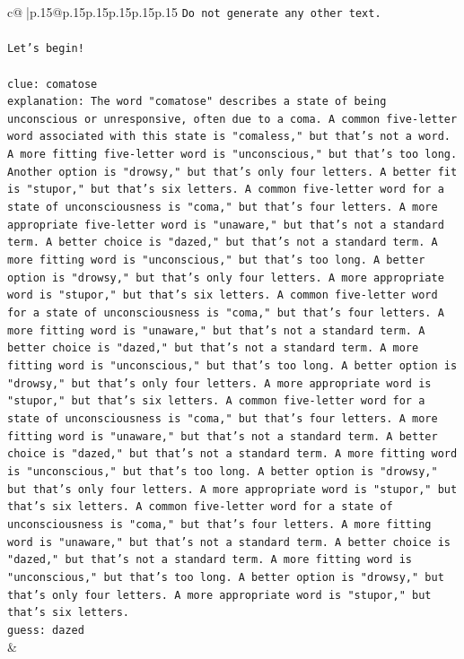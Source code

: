 \documentclass{article}
\begin{document}
{\begin{supertabular}{c@{$\;$}|p{.15\linewidth}@{}p{.15\linewidth}p{.15\linewidth}p{.15\linewidth}p{.15\linewidth}p{.15\linewidth}}
{{{\texttt{Do not generate any other text.} \\
\\ 
\texttt{Let's begin!} \\
\\ 
\texttt{clue: comatose} \\
\texttt{explanation: The word "comatose" describes a state of being unconscious or unresponsive, often due to a coma. A common five{-}letter word associated with this state is "comaless," but that's not a word. A more fitting five{-}letter word is "unconscious," but that's too long. Another option is "drowsy," but that's only four letters. A better fit is "stupor," but that's six letters. A common five{-}letter word for a state of unconsciousness is "coma," but that's four letters. A more appropriate five{-}letter word is "unaware," but that's not a standard term. A better choice is "dazed," but that's not a standard term. A more fitting word is "unconscious," but that's too long. A better option is "drowsy," but that's only four letters. A more appropriate word is "stupor," but that's six letters. A common five{-}letter word for a state of unconsciousness is "coma," but that's four letters. A more fitting word is "unaware," but that's not a standard term. A better choice is "dazed," but that's not a standard term. A more fitting word is "unconscious," but that's too long. A better option is "drowsy," but that's only four letters. A more appropriate word is "stupor," but that's six letters. A common five{-}letter word for a state of unconsciousness is "coma," but that's four letters. A more fitting word is "unaware," but that's not a standard term. A better choice is "dazed," but that's not a standard term. A more fitting word is "unconscious," but that's too long. A better option is "drowsy," but that's only four letters. A more appropriate word is "stupor," but that's six letters. A common five{-}letter word for a state of unconsciousness is "coma," but that's four letters. A more fitting word is "unaware," but that's not a standard term. A better choice is "dazed," but that's not a standard term. A more fitting word is "unconscious," but that's too long. A better option is "drowsy," but that's only four letters. A more appropriate word is "stupor," but that's six letters.} \\
\texttt{guess: dazed} \\
            }
        }
    }
    & \\ \\


\end{supertabular}}
\end{document}
